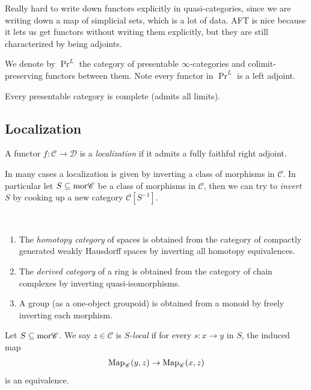 \documentclass[11pt,openany]{book}
\begin{document}
Really hard to write down functors explicitly in quasi-categories, since we are writing down a map of simplicial sets, which is a lot of data. AFT is nice because it lets us get functors without writing them explicitly, but they are still characterized by being adjoints.

\begin{notation}\label{nota:PrL}  We denote by $\Pr^L$ the category of presentable $\infty$-categories and colimit-preserving functors between them. Note every functor in $\Pr^L$ is a left adjoint.
\end{notation}

\begin{theorem} Every presentable category is complete (admits all limits).
\end{theorem}


\subsection{Localization}

\begin{definition} \cite[5.2.7.2]{HTT} A functor $f \colon \mathscr{C}\to \mathscr{D}$ is a \textit{localization} if it admits a fully faithful right adjoint.
\end{definition}

In many cases a localization is given by inverting a class of morphisms in $\mathscr{C}$. In particular let $S \subseteq \mathrm{mor} \mathscr{C}$ be a class of morphisms in $\mathscr{C}$, then we can try to \textit{invert} $S$ by cooking up a new category $\mathscr{C}[S^{-1}]$.

\begin{example} $\ $
\begin{enumerate}
    \item The \textit{homotopy category} of spaces is obtained from the category of compactly generated weakly Hausdorff spaces by inverting all homotopy equivalences.
    \item The \textit{derived category} of a ring is obtained from the category of chain complexes by inverting quasi-isomorphisms.
    \item A group (as a one-object groupoid) is obtained from a monoid by freely inverting each morphism.
\end{enumerate}
\end{example}



\begin{definition} \cite[5.5.4.1]{HTT} Let $S \subseteq \mathrm{mor} \mathscr{C}$. We say $z\in \mathscr{C}$ is $S$\textit{-local} if for every $s \colon x \to y$ in $S$, the induced map
\begin{align*}
    \mathrm{Map}_{\mathscr{C}}(y,z) \to \mathrm{Map}_{\mathscr{C}}(x,z)
\end{align*}
is an equivalence.
\end{definition}
\end{document}
